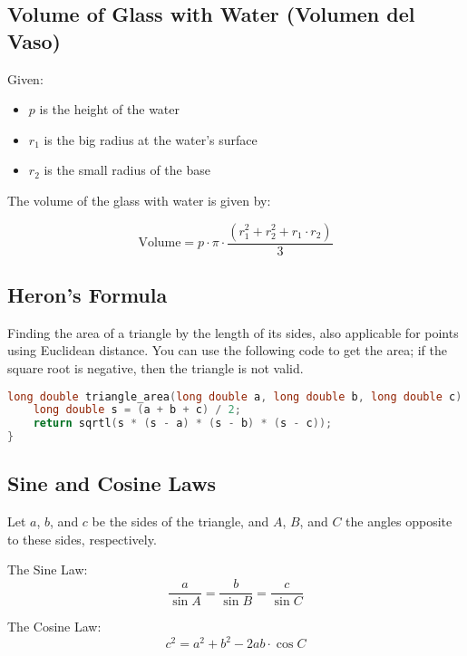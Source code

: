\subsection*{Volume of Glass with Water (Volumen del Vaso)}
Given:
\begin{itemize}
    \item \( p \) is the height of the water
    \item \( r_1 \) is the big radius at the water's surface
    \item \( r_2 \) is the small radius of the base
\end{itemize}

The volume of the glass with water is given by:

\[
\text{Volume} = p \cdot \pi \cdot \frac{ \left( r_1^2 + r_2^2 + r_1 \cdot r_2 \right)}{3}
\]

\subsection*{Heron's Formula}
Finding the area of a triangle by the length of its sides, also applicable for points using Euclidean distance. You can use the following code to get the area; if the square root is negative, then the triangle is not valid.

\begin{lstlisting}[language=C++, frame=None]
long double triangle_area(long double a, long double b, long double c) {
    long double s = (a + b + c) / 2;
    return sqrtl(s * (s - a) * (s - b) * (s - c));
}
\end{lstlisting}

\subsection*{Sine and Cosine Laws}
Let \( a \), \( b \), and \( c \) be the sides of the triangle, and \( A \), \( B \), and \( C \) the angles opposite to these sides, respectively.

The Sine Law:
\[
\frac{a}{\sin A} = \frac{b}{\sin B} = \frac{c}{\sin C}
\]

The Cosine Law:
\[
c^2 = a^2 + b^2 - 2ab \cdot \cos C
\]
